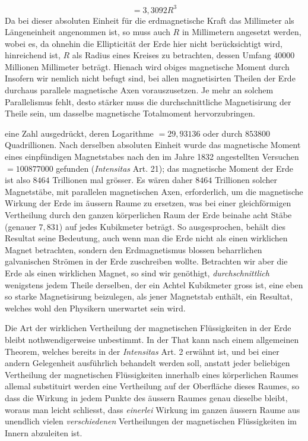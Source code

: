 \[
=3{,}3092R^3
\]
Da bei dieser absoluten Einheit für die erdmagnetische Kraft das Millimeter als Längeneinheit angenommen ist, so muss auch $R$ in Millimetern angesetzt werden, wobei es, da ohnehin die Ellipticität der Erde hier nicht berücksichtigt wird, hinreichend ist, $R$ als Radius eines Kreises zu betrachten, dessen Umfang $40000$ Millionen Millimeter beträgt. Hienach wird obiges magnetische Moment durch
\expandafter\def\csname HistoricalNoteText21\endcsname{Insofern wir nemlich nicht befugt sind, bei allen magnetisirten Theilen der Erde durchaus parallele magnetische Axen vorauszusetzen. Je mehr an solchem Parallelismus fehlt, desto stärker muss die durchschnittliche Magnetisirung der Theile sein, um dasselbe magnetische Totalmoment hervorzubringen.}
\par\clearpage
{}
\noindent eine Zahl ausgedrückt, deren Logarithme $=29{,}93136$ oder durch $853800$ Quadrillionen. Nach derselben absoluten Einheit wurde das magnetische Moment eines einpfündigen Magnetstabes nach den im Jahre 1832 angestellten Versuchen $=100877000$ gefunden (\textit{Intensitas} Art. 21); das magnetische Moment der Erde ist also $8464$ Trillionen mal grösser. Es wären daher $8464$ Trillionen solcher Magnetstäbe, mit parallelen magnetischen Axen, erforderlich, um die magnetische Wirkung der Erde im äussern Raume zu ersetzen, was bei einer gleichförmigen Vertheilung durch den ganzen körperlichen Raum der Erde beinahe acht Stäbe (genauer $7{,}831$) auf jedes Kubikmeter beträgt. So ausgesprochen, behält dies Resultat seine Bedeutung, auch wenn man die Erde nicht als einen wirklichen Magnet betrachten, sondern den Erdmagnetismus blossen beharrlichen galvanischen Strömen in der Erde zuschreiben wollte. Betrachten wir aber die Erde als einen wirklichen Magnet, so sind wir genöthigt, \textit{durchschnittlich} wenigstens jedem Theile derselben, der ein Achtel Kubikmeter gross ist, eine eben so starke Magnetisirung beizulegen, als jener Magnetstab enthält, ein Resultat, welches wohl den Physikern unerwartet sein wird.

Die Art der wirklichen Vertheilung der magnetischen Flüssigkeiten in der Erde bleibt nothwendigerweise unbestimmt. In der That kann nach einem allgemeinen Theorem, welches bereits in der \textit{Intensitas} Art. 2 erwähnt ist, und bei einer andern Gelegenheit ausführlich behandelt werden soll, anstatt jeder beliebigen Vertheilung der magnetischen Flüssigkeiten innerhalb eines körperlichen Raumes allemal substituirt werden eine Vertheilung auf der Oberfläche dieses Raumes, so dass die Wirkung in jedem Punkte des äussern Raumes genau dieselbe bleibt, woraus man leicht schliesst, dass \textit{einerlei} Wirkung im ganzen äussern Raume aus unendlich vielen \textit{verschiedenen} Vertheilungen der magnetischen Flüssigkeiten im Innern abzuleiten ist.

